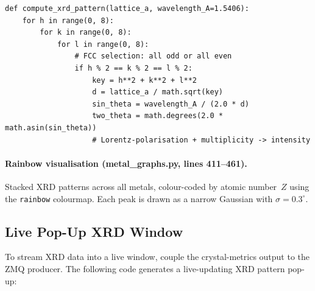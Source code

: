 \documentclass[11pt,a4paper]{article}
\begin{document}
\begin{lstlisting}[title={\textbf{Python --- FCC XRD pattern generator}}]
def compute_xrd_pattern(lattice_a, wavelength_A=1.5406):
    for h in range(0, 8):
        for k in range(0, 8):
            for l in range(0, 8):
                # FCC selection: all odd or all even
                if h % 2 == k % 2 == l % 2:
                    key = h**2 + k**2 + l**2
                    d = lattice_a / math.sqrt(key)
                    sin_theta = wavelength_A / (2.0 * d)
                    two_theta = math.degrees(2.0 * math.asin(sin_theta))
                    # Lorentz-polarisation + multiplicity -> intensity
\end{lstlisting}

\paragraph{Rainbow visualisation (metal\_graphs.py, lines 411--461).}
Stacked XRD patterns across all metals, colour-coded by atomic number~$Z$
using the \texttt{rainbow} colourmap.  Each peak is drawn as a narrow
Gaussian with $\sigma = 0.3^{\circ}$.

\subsection{Live Pop-Up XRD Window}

To stream XRD data into a live window, couple the crystal-metrics output
to the ZMQ producer.  The following code generates a live-updating XRD
pattern pop-up:
\end{document}
